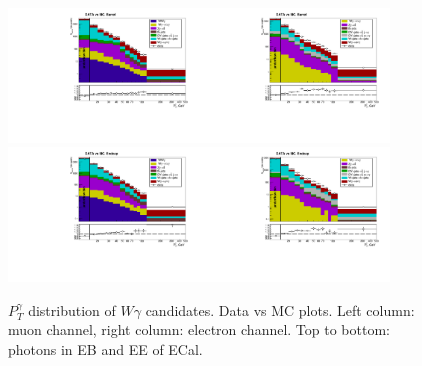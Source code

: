 \begin{figure}[htb]
  \begin{center}
   \includegraphics[width=0.45\textwidth]{../figs/figs_v11/MUON_WGamma/PrepareYields/c_TotalDATAvsMC_Barrel__phoEt.pdf}\includegraphics[width=0.45\textwidth]{../figs/figs_v11/ELECTRON_WGamma/PrepareYields/c_TotalDATAvsMC_Barrel__phoEt.pdf}
   \includegraphics[width=0.45\textwidth]{../figs/figs_v11/MUON_WGamma/PrepareYields/c_TotalDATAvsMC_Endcap__phoEt.pdf}\includegraphics[width=0.45\textwidth]{../figs/figs_v11/ELECTRON_WGamma/PrepareYields/c_TotalDATAvsMC_Endcap__phoEt.pdf}
  \caption{$P_T^{\gamma}$ distribution of $W\gamma$ candidates. Data vs MC plots. Left column: muon channel, right column: electron channel. Top to bottom: photons in EB and EE of ECal.}
  \label{fig:DATAvsMC}
  \end{center}
\end{figure}
